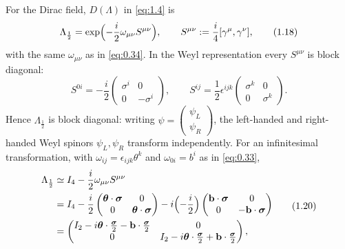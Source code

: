\documentclass[11pt,a4paper]{article}
\begin{document}
For the Dirac field, $D(\Lambda)$ in \eqref{eq:1.4} is
\begin{equation*}
\Lambda_{\frac12}=\exp\Bigl(-\frac i2\omega_{\mu\nu}S^{\mu\nu}\Bigr),
\qquad
S^{\mu\nu}:=\frac i4[\gamma^\mu,\gamma^\nu],
\tag{1.18}\label{eq:1.18}
\end{equation*}
with the same $\omega_{\mu\nu}$ as in \eqref{eq:0.34}. In the Weyl representation every $S^{\mu\nu}$ is block diagonal:
\begin{equation*}
S^{0i}=-\frac i2\begin{pmatrix}\sigma^i&0\\0&-\sigma^i\end{pmatrix},
\qquad
S^{ij}=\frac12\epsilon^{ijk}\begin{pmatrix}\sigma^k&0\\0&\sigma^k\end{pmatrix}.
\tag{1.19}\label{eq:1.19}
\end{equation*}
Hence $\Lambda_{\frac12}$ is block diagonal: writing $\psi=\begin{pmatrix}\psi_L\\\psi_R\end{pmatrix}$, the left-handed and right-handed Weyl spinors $\psi_L,\psi_R$ transform independently. For an infinitesimal transformation, with $\omega_{ij}=\epsilon_{ijk}\theta^k$ and $\omega_{0i}=b^i$ as in \eqref{eq:0.33},
\begin{equation*}
\begin{aligned}
\Lambda_{\frac12}
&\simeq I_4-\frac i2\omega_{\mu\nu}S^{\mu\nu}\\
&=I_4-\frac i2\begin{pmatrix}\boldsymbol\theta\cdot\boldsymbol\sigma&0\\0&\boldsymbol\theta\cdot\boldsymbol\sigma\end{pmatrix}
-i\Bigl(-\frac i2\Bigr)\begin{pmatrix}\mathbf b\cdot\boldsymbol\sigma&0\\0&-\mathbf b\cdot\boldsymbol\sigma\end{pmatrix}\\
&=\begin{pmatrix}I_2-i\boldsymbol\theta\cdot\frac{\boldsymbol\sigma}2-\mathbf b\cdot\frac{\boldsymbol\sigma}2&0\\0&I_2-i\boldsymbol\theta\cdot\frac{\boldsymbol\sigma}2+\mathbf b\cdot\frac{\boldsymbol\sigma}2\end{pmatrix},
\end{aligned}
\tag{1.20}\label{eq:1.20}
\end{equation*}
\end{document}
